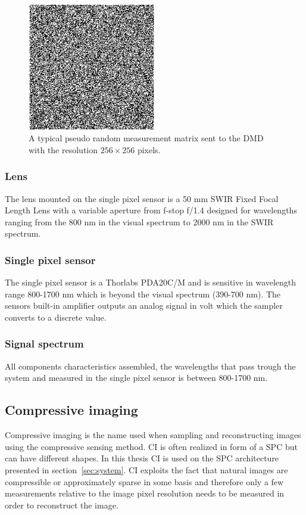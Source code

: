 \begin{figure}[H]
    \centering
    \includegraphics[width = 0.5\textwidth]{gfx/DMD_pattern.png}
    \caption{A typical pseudo random measurement matrix sent to the DMD with the resolution $256 \times 256$ pixels.}
    \label{fig:dmd_pattern}
\end{figure}



\subsubsection{Lens}
The lens mounted on the single pixel sensor is a 50 mm SWIR Fixed Focal Length Lens with a variable aperture from f-stop f/1.4 designed for wavelengths ranging from the 800 nm in the visual spectrum to 2000 nm in the SWIR spectrum. \cite{website:SWIR_objective}

\subsubsection{Single pixel sensor}
The single pixel sensor is a Thorlabs PDA20C/M and is sensitive in wavelength range 800-1700 nm which is beyond the visual spectrum (390-700 nm). The sensors built-in amplifier outputs an analog signal in volt which the sampler converts to a discrete value. \cite{manual:PDA}

\subsubsection{Signal spectrum}
All components characteristics assembled, the wavelengths that pass trough the system and measured in the single pixel sensor is between 800-1700 nm.



\subsection{Compressive imaging}
\label{sec:CI}
Compressive imaging is the name used when sampling and reconstructing images using the compressive sensing method. CI is often realized in form of a SPC but can have different shapes. In this thesis CI is used on the SPC architecture presented in section~\ref{sec:system}. CI exploits the fact that natural images are compressible or approximately sparse in some basis and therefore only a few measurements relative to the image pixel resolution needs to be measured in order to reconstruct the image.\\[0.1in]

